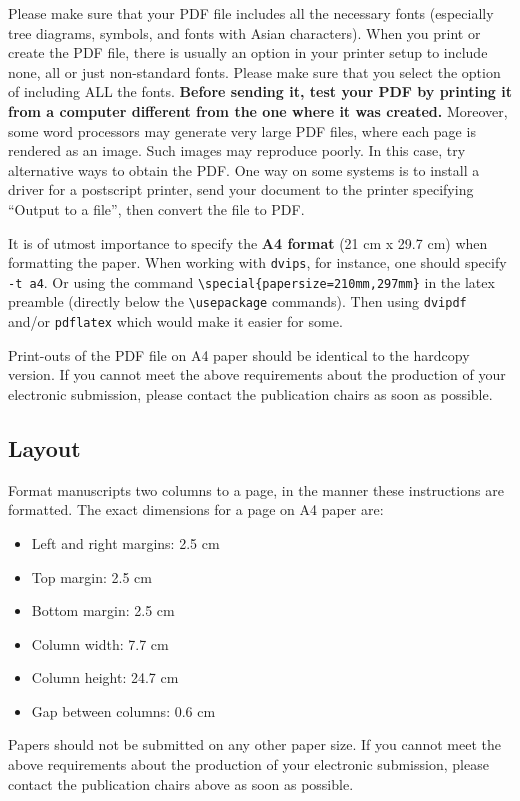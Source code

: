 \documentclass[11pt,a4paper]{article}
\begin{document}
Please make sure that your PDF file includes all the necessary fonts
(especially tree diagrams, symbols, and fonts with Asian
characters). When you print or create the PDF file, there is usually
an option in your printer setup to include none, all or just
non-standard fonts.  Please make sure that you select the option of
including ALL the fonts. \textbf{Before sending it, test your PDF by
  printing it from a computer different from the one where it was
  created.} Moreover, some word processors may generate very large PDF
files, where each page is rendered as an image. Such images may
reproduce poorly. In this case, try alternative ways to obtain the
PDF. One way on some systems is to install a driver for a postscript
printer, send your document to the printer specifying ``Output to a
file'', then convert the file to PDF.

It is of utmost importance to specify the \textbf{A4 format} (21 cm
x 29.7 cm) when formatting the paper. When working with
{\tt dvips}, for instance, one should specify {\tt -t a4}.
Or using the command \verb|\special{papersize=210mm,297mm}| in the latex
preamble (directly below the \verb|\usepackage| commands). Then using 
{\tt dvipdf} and/or {\tt pdflatex} which would make it easier for some.

Print-outs of the PDF file on A4 paper should be identical to the
hardcopy version. If you cannot meet the above requirements about the
production of your electronic submission, please contact the
publication chairs as soon as possible.

\subsection{Layout}
\label{ssec:layout}

Format manuscripts two columns to a page, in the manner these
instructions are formatted. The exact dimensions for a page on A4
paper are:

\begin{itemize}
\item Left and right margins: 2.5 cm
\item Top margin: 2.5 cm
\item Bottom margin: 2.5 cm
\item Column width: 7.7 cm
\item Column height: 24.7 cm
\item Gap between columns: 0.6 cm
\end{itemize}

\noindent Papers should not be submitted on any other paper size.
 If you cannot meet the above requirements about the production of 
 your electronic submission, please contact the publication chairs 
 above as soon as possible.
\end{document}
